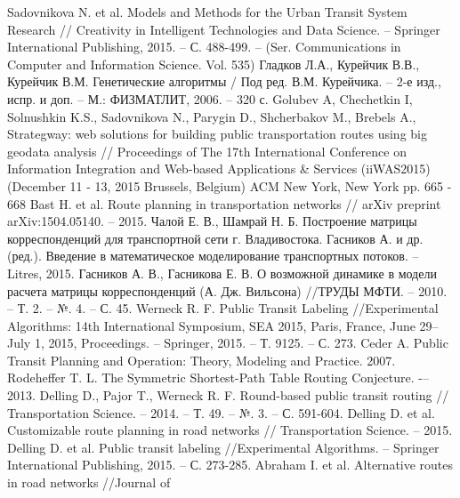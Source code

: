 \begin{thebibliography}{10}
     Sadovnikova N. et al. Models and Methods for the Urban Transit System Research //
        Creativity in Intelligent Technologies and Data Science. -- Springer International Publishing, 
        2015. -- С. 488-499. -- (Ser. Communications in Computer and Information Science. Vol. 535)
     Гладков Л.А., Курейчик В.В., Курейчик В.М. Генетические алгоритмы / 
        Под ред. В.М. Курейчика. -- 2-е изд., испр. и доп. -- М.: ФИЗМАТЛИТ, 2006. -- 320 с.
     Golubev A, Chechetkin I, Solnushkin K.S., Sadovnikova N., Parygin D., Shcherbakov M., 
        Brebels A., Strategway: web solutions for building public transportation routes using big geodata 
        analysis // Proceedings of The 17th International Conference on Information Integration and 
        Web-based Applications \& Services (iiWAS2015) (December 11 - 13, 2015 Brussels, Belgium) 
        ACM New York, New York pp. 665 - 668
     Bast H. et al. Route planning in transportation networks //
        arXiv preprint arXiv:1504.05140. -- 2015.
     Чалой Е. В., Шамрай Н. Б. Построение матрицы корреспонденций для транспортной 
        сети г. Владивостока.
     Гасников А. и др. (ред.). Введение в математическое моделирование транспортных 
        потоков. -- Litres, 2015.
     Гасников А. В., Гасникова Е. В. О возможной динамике в модели расчета матрицы 
        корреспонденций (А. Дж. Вильсона) //ТРУДЫ МФТИ. -- 2010. -- Т. 2. -- №. 4. -- С. 45.
     Werneck R. F. Public Transit Labeling //Experimental Algorithms: 
        14th International Symposium, SEA 2015, Paris, France, June 29–July 1, 2015, 
        Proceedings. -- Springer, 2015. -- Т. 9125. -- С. 273.
     Ceder A. Public Transit Planning and Operation: Theory, Modeling and Practice. 2007.
     Rodeheffer T. L. The Symmetric Shortest-Path Table Routing 
        Conjecture. -– 2013.
     Delling D., Pajor T., Werneck R. F. Round-based public transit routing //
        Transportation Science. -- 2014. -- Т. 49. -- №. 3. -- С. 591-604.
     Delling D. et al. Customizable route planning in road networks //
        Transportation Science. -- 2015.
     Delling D. et al. Public transit labeling //Experimental Algorithms. -- 
        Springer International Publishing, 2015. -- С. 273-285.
     Abraham I. et al. Alternative routes in road networks //Journal of 

\end{thebibliography}

